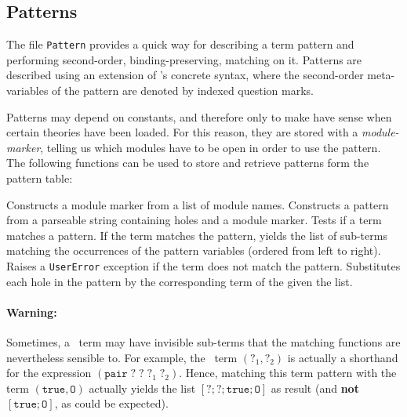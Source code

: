 \subsection[Patterns]{Patterns\label{Patterns}}

The \ocaml{} file \texttt{Pattern} provides a quick way for describing a
term pattern and performing second-order, binding-preserving, matching
on it. Patterns are described using an extension of \Coq's concrete
syntax, where the second-order meta-variables of the pattern are
denoted by indexed question marks. 

Patterns may depend on constants, and therefore only to make have
sense when certain theories have been loaded. For this reason, they
are stored with a \textsl{module-marker}, telling us which modules
have to be open in order to use the pattern. The following functions
can be used to store and retrieve patterns form the pattern table:

\begin{description}
    {Constructs a module marker from a list of module names.}
    {Constructs a pattern from a parseable string containing holes
     and a module marker.}
    {Tests if a term matches a pattern.} 
    {If the term matches the pattern, yields the list of sub-terms
     matching the occurrences of the pattern variables (ordered from
     left to right). Raises a \texttt{UserError} exception if the term
     does not match the pattern.} 
    {Substitutes each hole in the pattern 
     by the corresponding term of the given the list.}
\end{description}

\paragraph{Warning:} Sometimes, a \Coq\ term may have invisible
sub-terms that the matching functions are nevertheless sensible to.
For example, the \Coq\ term $(?_1,?_2)$ is actually a shorthand for
the expression $(\texttt{pair}\;?\;?\;?_1\;?_2)$.
Hence, matching this term pattern 
with the term $(\texttt{true},\texttt{O})$ actually yields the list
$[?;?;\texttt{true};\texttt{O}]$ as result (and \textbf{not}
$[\texttt{true};\texttt{O}]$, as could be expected).

